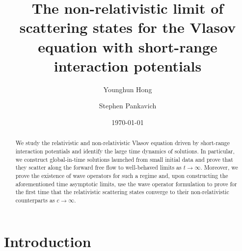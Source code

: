 \documentclass[reqno, 11pt, letterpaper]{amsart}
\title[Non-relativistic limit of scattering states]{The non-relativistic limit of scattering states for the Vlasov equation with short-range interaction potentials}
\date{\today}
\author[Y. Hong]{Younghun Hong}
\author[S. Pankavich]{Stephen Pankavich}
\theoremstyle{remark}
\numberwithin{equation}{section}
\numberwithin{theorem}{section}
\numberwithin{table}{section}
\numberwithin{figure}{section}
\begin{document}
\begin{abstract}
We study the relativistic and non-relativistic Vlasov equation driven by short-range interaction potentials and identify the large time dynamics of solutions. In particular, we construct global-in-time solutions launched from small initial data and prove that they scatter along the forward free flow to well-behaved limits as $t \to \infty$. Moreover, we prove the existence of wave operators for such a regime and, upon constructing the aforementioned time asymptotic limits, use the wave operator formulation to prove for the first time that the relativistic scattering states converge to their non-relativistic counterparts as $c \to \infty$.
\end{abstract}

\maketitle


\section{Introduction}
\end{document}
